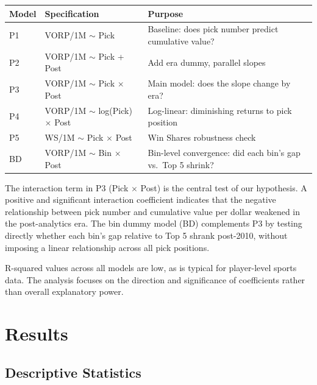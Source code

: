 \documentclass[12pt,letterpaper]{article}
\begin{document}
\begin{center}
\small
\setlength{\tabcolsep}{4pt}
\begin{tabular}{@{}llp{}@{}}
\toprule
\textbf{Model} & \textbf{Specification} & \textbf{Purpose} \\
\midrule
P1 & VORP/1M $\sim$ Pick & Baseline: does pick number predict cumulative value? \\
P2 & VORP/1M $\sim$ Pick + Post & Add era dummy, parallel slopes \\
P3 & VORP/1M $\sim$ Pick $\times$ Post & Main model: does the slope change by era? \\
P4 & VORP/1M $\sim$ log(Pick) $\times$ Post & Log-linear: diminishing returns to pick position \\
P5 & WS/1M $\sim$ Pick $\times$ Post & Win Shares robustness check \\
BD & VORP/1M $\sim$ Bin $\times$ Post & Bin-level convergence: did each bin's gap vs.\ Top 5 shrink? \\
\bottomrule
\end{tabular}
\end{center}

The interaction term in P3 (Pick $\times$ Post) is the central test of our hypothesis. A positive and significant interaction coefficient indicates that the negative relationship between pick number and cumulative value per dollar weakened in the post-analytics era. The bin dummy model (BD) complements P3 by testing directly whether each bin's gap relative to Top 5 shrank post-2010, without imposing a linear relationship across all pick positions.

R-squared values across all models are low, as is typical for player-level sports data. The analysis focuses on the direction and significance of coefficients rather than overall explanatory power.


\section{Results}

\subsection{Descriptive Statistics}
\end{document}
